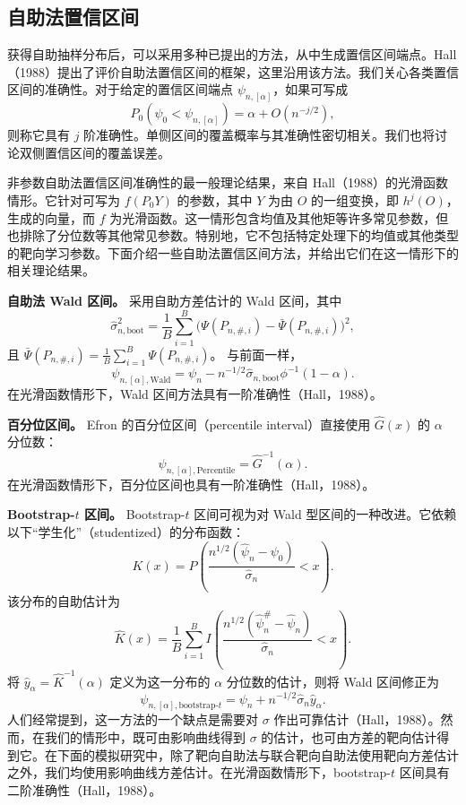 \subsection{自助法置信区间}

获得自助抽样分布后，可以采用多种已提出的方法，从中生成置信区间端点。Hall（1988）提出了评价自助法置信区间的框架，这里沿用该方法。我们关心各类置信区间的准确性。对于给定的置信区间端点 $\psi_{n,[\alpha]}$，如果可写成
\[
 P_0(\psi_0<\psi_{n,[\alpha]})=\alpha+O(n^{-j/2}),
\]
则称它具有 $j$ 阶准确性。单侧区间的覆盖概率与其准确性密切相关。我们也将讨论双侧置信区间的覆盖误差。

非参数自助法置信区间准确性的最一般理论结果，来自 Hall（1988）的光滑函数情形。它针对可写为 $f(P_0Y)$ 的参数，其中 $Y$ 为由 $O$ 的一组变换，即 $h^j(O)$，生成的向量，而 $f$ 为光滑函数。这一情形包含均值及其他矩等许多常见参数，但也排除了分位数等其他常见参数。特别地，它不包括特定处理下的均值或其他类型的靶向学习参数。下面介绍一些自助法置信区间方法，并给出它们在这一情形下的相关理论结果。

\noindent\textbf{自助法 Wald 区间。}\enspace
采用自助方差估计的 Wald 区间，其中
\[
 \hat\sigma_{n,\mathrm{boot}}^2
 =\frac1B\sum_{i=1}^B
 \bigl(\Psi(P_{n,\#,i})-\bar\Psi(P_{n,\#,i})\bigr)^2,
\]
且 $\bar\Psi(P_{n,\#,i})=\frac1B\sum_{i=1}^B\Psi(P_{n,\#,i})$。
与前面一样，
\[
 \psi_{n,[\alpha],\mathrm{Wald}}
 =\psi_n-n^{-1/2}\hat\sigma_{n,\mathrm{boot}}\phi^{-1}(1-\alpha).
\]
在光滑函数情形下，Wald 区间方法具有一阶准确性（Hall，1988）。

\noindent\textbf{百分位区间。}\enspace
Efron 的百分位区间（percentile interval）直接使用 $\hat G(x)$ 的 $\alpha$ 分位数：
\[
 \psi_{n,[\alpha],\mathrm{Percentile}}=\hat G^{-1}(\alpha).
\]
在光滑函数情形下，百分位区间也具有一阶准确性（Hall，1988）。

\noindent\textbf{Bootstrap-$t$ 区间。}\enspace
Bootstrap-$t$ 区间可视为对 Wald 型区间的一种改进。它依赖以下“学生化”（studentized）的分布函数：
\[
 K(x)=P\left(\frac{n^{1/2}(\hat\psi_n-\psi_0)}{\hat\sigma_n}<x\right).
\]
该分布的自助估计为
\[
 \hat K(x)=\frac1B\sum_{i=1}^B
 I\left(\frac{n^{1/2}(\hat\psi_n^\#-\hat\psi_n)}{\hat\sigma_n}<x\right).
\]
将 $\hat y_\alpha=\hat K^{-1}(\alpha)$ 定义为这一分布的 $\alpha$ 分位数的估计，则将 Wald 区间修正为
\[
 \psi_{n,[\alpha],\mathrm{bootstrap}\text{-}t}
 =\psi_n+n^{-1/2}\hat\sigma_n\hat y_\alpha.
\]
人们经常提到，这一方法的一个缺点是需要对 $\sigma$ 作出可靠估计（Hall，1988）。然而，在我们的情形中，既可由影响曲线得到 $\sigma$ 的估计，也可由方差的靶向估计得到它。在下面的模拟研究中，除了靶向自助法与联合靶向自助法使用靶向方差估计之外，我们均使用影响曲线方差估计。在光滑函数情形下，bootstrap-$t$ 区间具有二阶准确性（Hall，1988）。

